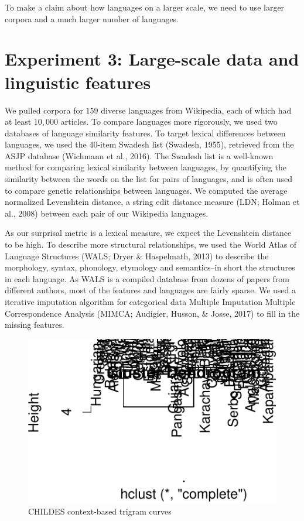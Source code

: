 \documentclass[10pt, letterpaper]{article}
\newenvironment{CodeChunk}{}{}
\begin{document}
To make a claim about how languages on a larger scale, we need to use
larger corpora and a much larger number of languages.

\hypertarget{experiment-3-large-scale-data-and-linguistic-features}{%
\section{Experiment 3: Large-scale data and linguistic
features}\label{experiment-3-large-scale-data-and-linguistic-features}}

We pulled corpora for \(159\) diverse languages from Wikipedia, each of
which had at least \(10,000\) articles. To compare languages more
rigorously, we used two databases of language similarity features. To
target lexical differences between languages, we used the \(40\)-item
Swadesh list (Swadesh, 1955), retrieved from the ASJP database (Wichmann
et al., 2016). The Swadesh list is a well-known method for comparing
lexical similarity between languages, by quantifying the similarity
between the words on the list for pairs of languages, and is often used
to compare genetic relationships between languages. We computed the
average normalized Levenshtein distance, a string edit distance measure
(LDN; Holman et al., 2008) between each pair of our Wikipedia languages.

As our surprisal metric is a lexical measure, we expect the Levenshtein
distance to be high. To describe more structural relationships, we used
the World Atlas of Language Structures (WALS; Dryer \& Haspelmath, 2013)
to describe the morphology, syntax, phonology, etymology and
semantics--in short the structures in each language. As WALS is a
compiled database from dozens of papers from different authors, most of
the features and languages are fairly sparse. We used a iterative
imputation algorithm for categorical data Multiple Imputation Multiple
Correspondence Analysis (MIMCA; Audigier, Husson, \& Josse, 2017) to
fill in the missing features.

\begin{CodeChunk}
\begin{figure}[tb]
\includegraphics{figs/dendro-1} \caption[CHILDES context-based trigram curves]{CHILDES context-based trigram curves}\label{fig:dendro}
\end{figure}
\end{CodeChunk}
\end{document}
